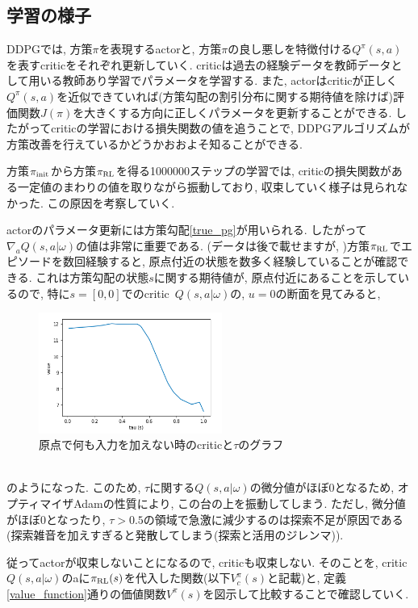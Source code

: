 \documentclass{jsarticle}
\begin{document}
\subsection{学習の様子}
DDPGでは, 方策$\pi$を表現するactorと, 方策$\pi$の良し悪しを特徴付ける$Q^{\pi}(s,a)$を表すcriticをそれぞれ更新していく. criticは過去の経験データを教師データとして用いる教師あり学習でパラメータを学習する. また, actorはcriticが正しく$Q^{\pi}(s,a)$を近似できていれば(方策勾配の割引分布に関する期待値を除けば)評価関数$J(\pi)$を大きくする方向に正しくパラメータを更新することができる. したがってcriticの学習における損失関数の値を追うことで, DDPGアルゴリズムが方策改善を行えているかどうかおおよそ知ることができる.\par
方策$\pi_{\rm{init}}$から方策$\pi_{\rm{RL}}$を得る1000000ステップの学習では, criticの損失関数がある一定値のまわりの値を取りながら振動しており, 収束していく様子は見られなかった. この原因を考察していく.\par
actorのパラメータ更新には方策勾配\eqref{true_pg}が用いられる. したがって$\nabla_{a}Q(s,a|\omega)$の値は非常に重要である. (データは後で載せますが, )方策$\pi_{\rm{RL}}$でエピソードを数回経験すると, 原点付近の状態を数多く経験していることが確認できる. これは方策勾配の状態$s$に関する期待値が, 原点付近にあることを示しているので, 特に$s=[0,0]$でのcritic~$Q(s,a|\omega)$の, $u=0$の断面を見てみると,
\begin{figure}[h]
	\centering
 	\includegraphics[width=6cm]{tau_gradient_origin.png}
 	\caption{原点で何も入力を加えない時のcriticと$\tau$のグラフ} \label{tau_gradient_origin}
\end{figure}\\
のようになった. このため, $\tau$に関する$Q(s,a|\omega)$の微分値がほぼ0となるため, オプティマイザAdamの性質により, この台の上を振動してしまう. ただし, 微分値がほぼ0となったり, $\tau>0.5$の領域で急激に減少するのは探索不足が原因である(探索雑音を加えすぎると発散してしまう(探索と活用のジレンマ)).\par 
従ってactorが収束しないことになるので, criticも収束しない. そのことを, critic~$Q(s,a|\omega)$のaに$\pi_{\rm{RL}}(s)$を代入した関数(以下$V^{\pi}_{c}(s)$と記載)と, 定義\eqref{value_function}通りの価値関数$V^{\pi}(s)$を図示して比較することで確認していく.
\end{document}
